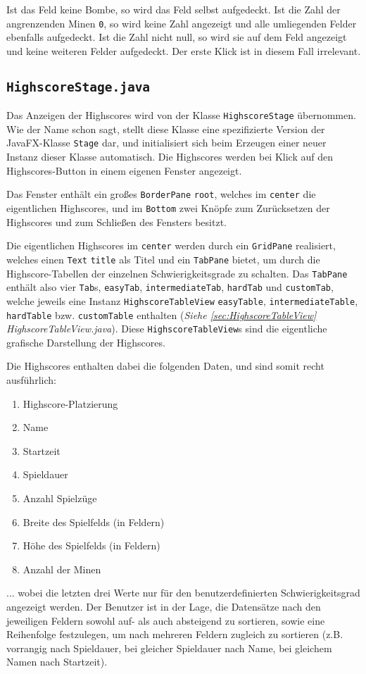 \documentclass[oneside,12pt]{scrartcl}
\newcommand*{\EnableHyphenationInTexttt}{\hyphenchar\font=45\relax}%
\newcommand{\class}[1]{\textcolor{Green4}{\bcode{#1}}}
\newcommand{\attribute}[1]{\textcolor{SkyBlue3}{\bcode{#1}}}
\newcommand{\classattribute}[2]{\class{#1} \attribute{#2}}
\newcommand{\bcode}[1]{\texttt{\EnableHyphenationInTexttt#1}}
\begin{document}
Ist das Feld keine Bombe, so wird das Feld selbst aufgedeckt. Ist die Zahl der angrenzenden Minen \texttt{0}, so wird keine Zahl angezeigt und alle umliegenden Felder ebenfalls aufgedeckt. Ist die Zahl nicht null, so wird sie auf dem Feld angezeigt und keine weiteren Felder aufgedeckt. Der erste Klick ist in diesem Fall irrelevant.

\subsection{\class{HighscoreStage.java}}
Das Anzeigen der Highscores wird von der Klasse \class{HighscoreStage} übernommen. Wie der Name schon sagt, stellt diese Klasse eine spezifizierte Version der JavaFX-Klasse \class{Stage} dar, und initialisiert sich beim Erzeugen einer neuer Instanz dieser Klasse automatisch. Die Highscores werden bei Klick auf den Highscores-Button in einem eigenen Fenster angezeigt.

Das Fenster enthält ein großes \classattribute{BorderPane}{root}, welches im \attribute{center} die eigentlichen Highscores, und im \attribute{Bottom} zwei Knöpfe zum Zurücksetzen der Highscores und zum Schließen des Fensters besitzt.

Die eigentlichen Highscores im \attribute{center} werden durch ein \class{GridPane} realisiert, welches einen \classattribute{Text}{title} als Titel und ein \class{TabPane} bietet, um durch die Highscore-Tabellen der einzelnen Schwierigkeitsgrade zu schalten. Das \class{TabPane} enthält also vier \class{Tab}s, \attribute{easyTab}, \attribute{intermediateTab}, \attribute{hardTab} und \attribute{customTab}, welche jeweils eine Instanz \classattribute{HighscoreTableView}{easyTable}, \attribute{intermediateTable}, \attribute{hardTable} bzw. \attribute{customTable} enthalten (\textit{Siehe \ref{sec:HighscoreTableView} HighscoreTableView.java}). Diese \class{HighscoreTableView}s sind die eigentliche grafische Darstellung der Highscores.

Die Highscores enthalten dabei die folgenden Daten, und sind somit recht ausführlich:
\begin{enumerate}
\item Highscore-Platzierung
\item Name
\item Startzeit
\item Spieldauer
\item Anzahl Spielzüge
\item Breite des Spielfelds (in Feldern)
\item Höhe des Spielfelds (in Feldern)
\item Anzahl der Minen
\end{enumerate}
... wobei die letzten drei Werte nur für den benutzerdefinierten Schwierigkeitsgrad angezeigt werden. Der Benutzer ist in der Lage, die Datensätze nach den jeweiligen Feldern sowohl auf- als auch absteigend zu sortieren, sowie eine Reihenfolge festzulegen, um nach mehreren Feldern zugleich zu sortieren (z.B. vorrangig nach Spieldauer, bei gleicher Spieldauer nach Name, bei gleichem Namen nach Startzeit).
\end{document}
